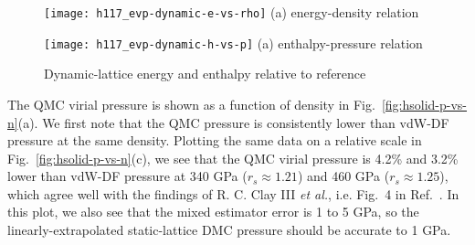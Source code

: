 \begin{figure}[h]
\begin{minipage}{0.49\textwidth}
\centering
\texttt{[image: h117\_evp-dynamic-e-vs-rho]}
(a) energy-density relation
\end{minipage}
\begin{minipage}{0.49\textwidth}
\centering
\texttt{[image: h117\_evp-dynamic-h-vs-p]}
(a) enthalpy-pressure relation
\end{minipage}
\caption{Dynamic-lattice energy and enthalpy relative to reference }
\label{fig:dynamic-qmc-vs-drummond}
\end{figure}

The QMC virial pressure is shown as a function of density in Fig.~\ref{fig:hsolid-p-vs-n}(a).
We first note that the QMC pressure is consistently lower than vdW-DF pressure at the same density.
Plotting the same data on a relative scale in Fig.~\ref{fig:hsolid-p-vs-n}(c),
we see that the QMC virial pressure is 4.2\% and 3.2\% lower than vdW-DF pressure at 340 GPa ($r_s\approx 1.21$) and 460 GPa ($r_s\approx 1.25$), which agree well with the findings of R. C. Clay III \textit{et al.}, i.e. Fig.~4 in Ref.~\cite{Clay2016}.
In this plot, we also see that the mixed estimator error is 1 to 5 GPa, so the linearly-extrapolated static-lattice DMC pressure should be accurate to 1 GPa.

